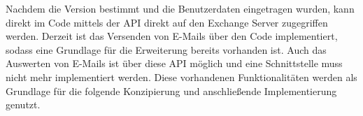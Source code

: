 \noindent
Nachdem die Version bestimmt und die Benutzerdaten eingetragen wurden, kann direkt im Code mittels der API direkt auf den Exchange Server zugegriffen werden. Derzeit ist das Versenden von E-Mails über den Code implementiert, sodass eine Grundlage für die Erweiterung bereits vorhanden ist. Auch das Auswerten von E-Mails ist über diese API möglich und eine Schnittstelle muss nicht mehr implementiert werden. Diese vorhandenen Funktionalitäten werden als Grundlage für die folgende Konzipierung und anschließende Implementierung genutzt. 
